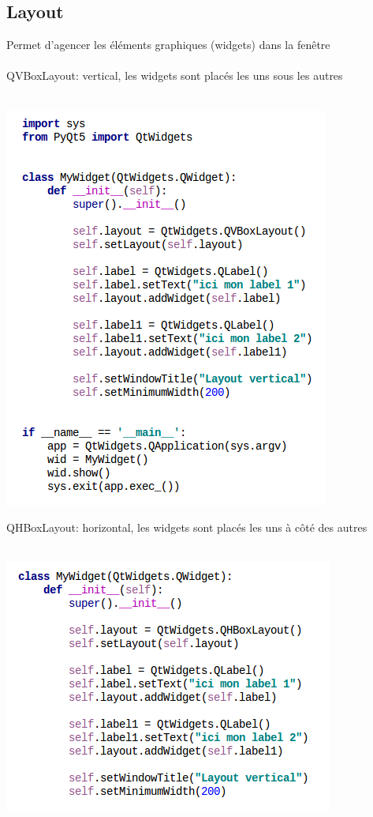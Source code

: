 \documentclass[9pt, french, brown]{beamer}
\newcommand{\mytitle}[1]{{\color{brown}#1 \\~\\}}
\begin{document}
\subsection{Layout}
\begin{frame}{\secname}{\subsecname}
Permet d\rq{}agencer les éléments graphiques (widgets) dans la fenêtre\\
~\\
\mytitle{QVBoxLayout: vertical, les widgets sont placés les uns sous les autres}
\begin{center}\includegraphics[scale=0.35]{img/widget3_1}\end{center}
\end{frame}

\begin{frame}{\secname}{\subsecname}
\mytitle{QHBoxLayout: horizontal, les widgets sont placés les uns à côté des autres}
\begin{center}\includegraphics[scale=0.4]{img/widget4_1}\end{center}
\end{frame}
\end{document}
